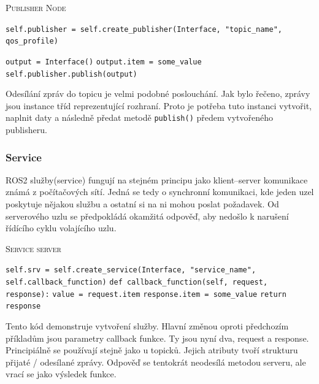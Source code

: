 \begin{algorithm}[h!]
	\label{}
	\caption{\textsc{Publisher Node}}
	
	\DontPrintSemicolon
	\SetAlgoNoLine
	\SetNlSty{}{}{:}
	\SetNlSkip{-1.1em}
	
	\BlankLine \Indp\Indpp
	\texttt{self.publisher = self.create\_publisher(Interface, "topic\_name", qos\_profile)}\;
	
	\BlankLine
	\texttt{output = Interface()}\;
	\texttt{output.item = some\_value}\;
	\texttt{self.publisher.publish(output)}\;
\end{algorithm}
Odesílání zpráv do topicu je velmi podobné poslouchání. Jak bylo řečeno, zprávy jsou instance tříd reprezentující rozhraní. Proto je potřeba tuto instanci vytvořit, naplnit daty a následně předat metodě \verb|publish()| předem vytvořeného publisheru. \cite{ros2_documentation}

\subsubsection*{Service}
ROS2 služby(service) fungují na stejném principu jako klient--server komunikace známá z počítačových sítí. Jedná se tedy o synchronní komunikaci, kde jeden uzel poskytuje nějakou službu a ostatní si na ni mohou poslat požadavek. Od serverového uzlu se předpokládá okamžitá odpověď, aby nedošlo k narušení řídícího cyklu volajícího uzlu. \cite{ros2_introduction}

\begin{algorithm}[h!]
	\label{}
	\caption{\textsc{Service server}}
	
	\DontPrintSemicolon
	\SetAlgoNoLine
	\SetAlgoNlRelativeSize{-1}
	\SetNlSty{}{}{:}
	\SetNlSkip{-1.1em}
	
	\BlankLine \Indp\Indpp
	
	\texttt{self.srv = self.create\_service(Interface, "service\_name", self.callback\_function)}\;
	\BlankLine
	\texttt{def callback\_function(self, request, response):}\;
	\Indp\Indp
	\texttt{value = request.item}\;
	\texttt{response.item = some\_value}\;
	\texttt{return response}\;
	
\end{algorithm}
Tento kód demonstruje vytvoření služby. Hlavní změnou oproti předchozím příkladům jsou parametry callback funkce. Ty jsou nyní dva, request a response. Principiálně se používají stejně jako u topicků. Jejich atributy tvoří strukturu přijaté / odesílané zprávy. Odpověď se tentokrát neodesílá metodou serveru, ale vrací se jako výsledek funkce. \cite{ros2_documentation}

